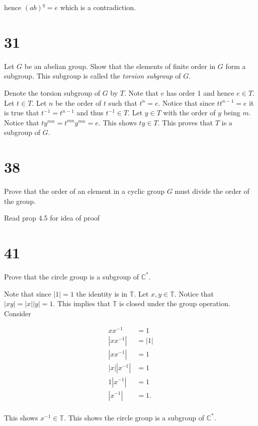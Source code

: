 \documentclass[a4paper]{article}
\begin{document}
hence $(ab)^q = e$ which is a contradiction. 




\section*{31}


Let $G$ be an abelian group. Show that the elements of finite order in $G$ form a subgroup. This subgroup is called the \textit{torsion subgroup} of $G$.

\vspace{\baselineskip}

Denote the torsion subgroup of $G$ by $T$. Note that $e$ has order 1 and hence $e \in T$. Let $t \in T$. Let $n$ be the order of $t$ such that $t^n = e$. Notice that since $tt^{n-1} = e$ it is true that $t^{-1} = t^{n-1}$ and thus $t^{-1} \in T$. Let $y \in T$ with the order of $y$ being $m$. Notice that $ty^{mn} = t^{mn}y^{mn} = e$. This shows $ty \in T$. This proves that $T$ is a subgroup of $G$. 


\section*{38}

Prove that the order of an element in a cyclic group $G$ must divide the order of the group.

\vspace{\baselineskip}

Read prop 4.5 for idea of proof


\section*{41}

Prove that the circle group is a subgroup of $\mathbb{C}^*$.

\vspace{\baselineskip}

Note that since $|1| = 1$ the identity is in $\mathbb{T}$. Let $x,y \in \mathbb{T}$. Notice that $|xy| = |x||y| = 1$. This implies that $\mathbb{T}$ is closed under the group operation. Consider 

\begin{align*}
x x^{-1} &= 1 \\
|x x ^{-1}| &= |1| \\
|x x ^{-1}| &= 1 \\
|x| |x ^{-1}| &= 1 \\
1 | x ^{-1}| &= 1 \\
|x ^{-1}| &= 1 .\\
\end{align*}

This shows $x^{-1} \in \mathbb{T}$. This shows the circle group is a subgroup of $\mathbb{C}^*$.
\end{document}
